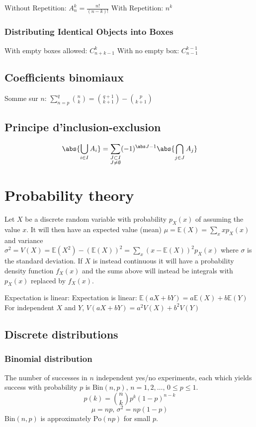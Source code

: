     Without Repetition: $A_n^k = \frac{n!}{(n - k)!}$
    With Repetition: $n^k$
    
    \subsubsection{Distributing Identical Objects into Boxes}  
    
    With empty boxes allowed: $C_{n+k-1}^k$
    With no empty box: $C_{n-1}^{k-1}$

    \subsection{Coefficients binomiaux}
    \item Somme sur $n$: $\sum_{n = p}^q \binom n k = \binom{q + 1}{k + 1} - \binom{p}{k + 1}$
    
    \subsection{Principe d'inclusion-exclusion}
    $$
        \abs{\bigcup_{i \in I} A_i} = \sum_{\substack{J \subset I \\ J \neq \emptyset}} (-1)^{\abs J - 1} \abs{\bigcap_{j \in J} A_j}
    $$

\section{Probability theory}
Let $X$ be a discrete random variable with probability $p_X(x)$ of assuming the value $x$. It will then have an expected value (mean) $\mu=\mathbb{E}(X)=\sum_xxp_X(x)$ and variance $\sigma^2=V(X)=\mathbb{E}(X^2)-(\mathbb{E}(X))^2=\sum_x(x-\mathbb{E}(X))^2p_X(x)$ where $\sigma$ is the standard deviation. If $X$ is instead continuous it will have a probability density function $f_X(x)$ and the sums above will instead be integrals with $p_X(x)$ replaced by $f_X(x)$.

Expectation is linear:
Expectation is linear: $\mathbb{E}(aX+bY) = a\mathbb{E}(X)+b\mathbb{E}(Y)$ \\
For independent $X$ and $Y$, $V(aX+bY) = a^2V(X)+b^2V(Y)$

\subsection{Discrete distributions}

\subsubsection{Binomial distribution}
The number of successes in $n$ independent yes/no experiments, each which yields success with probability $p$ is $\textrm{Bin}(n,p),\,n=1,2,\dots,\, 0\leq p\leq1$.
\[p(k)=\binom{n}{k}p^k(1-p)^{n-k}\]
\[\mu = np,\,\sigma^2=np(1-p)\]
$\textrm{Bin}(n,p)$ is approximately $\textrm{Po}(np)$ for small $p$.

